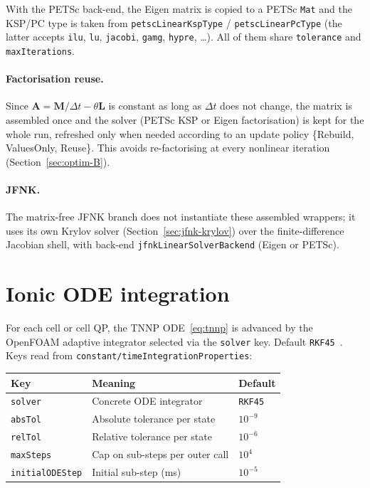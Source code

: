 \documentclass[11pt,a4paper]{article}
\newcommand{\code}[1]{\texttt{\small #1}}
\newcommand{\Mmass}{\mathbf{M}}
\newcommand{\Lop}{\mathbf{L}}
\newcommand{\Aimp}{\mathbf{A}}
\begin{document}
With the PETSc back-end, the Eigen matrix is copied to a PETSc \code{Mat} and the
KSP/PC type is taken from \code{petscLinearKspType} / \code{petscLinearPcType}
(the latter accepts \code{ilu}, \code{lu}, \code{jacobi}, \code{gamg}, \code{hypre},
\dots). All of them share \code{tolerance} and \code{maxIterations}.

\paragraph{Factorisation reuse.}
Since $\Aimp=\Mmass/\Delta t-\theta\Lop$ is constant as long as $\Delta t$ does not change,
the matrix is assembled once and the solver (PETSc KSP or Eigen
factorisation) is kept for the whole run, refreshed only when needed according to
an update policy \{Rebuild, ValuesOnly, Reuse\}. This avoids
re-factorising at every nonlinear iteration (Section~\ref{sec:optim-B}).

\paragraph{JFNK.}
The matrix-free JFNK branch does not instantiate these assembled wrappers; it uses
its own Krylov solver (Section~\ref{sec:jfnk-krylov}) over the finite-difference
Jacobian shell, with back-end \code{jfnkLinearSolverBackend} (Eigen or PETSc).

\section{Ionic ODE integration}

For each cell or cell QP, the TNNP ODE~\eqref{eq:tnnp} is advanced by
the OpenFOAM adaptive integrator selected via the \code{solver} key.
Default \code{RKF45}~\cite{hairer2}. Keys read from
\code{constant/timeIntegrationProperties}:

\begin{center}
\begin{tabular}{@{}lll@{}}
\toprule
Key & Meaning & Default \\
\midrule
\code{solver} & Concrete ODE integrator & \code{RKF45} \\
\code{absTol} & Absolute tolerance per state & $10^{-9}$ \\
\code{relTol} & Relative tolerance per state & $10^{-6}$ \\
\code{maxSteps} & Cap on sub-steps per outer call & $10^{4}$ \\
\code{initialODEStep} & Initial sub-step (ms) & $10^{-5}$ \\
\bottomrule
\end{tabular}
\end{center}
\end{document}
